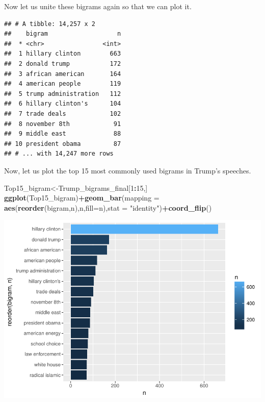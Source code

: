 \documentclass[]{article}
\newenvironment{Shaded}{\begin{snugshade}}{\end{snugshade}}
\newcommand{\KeywordTok}[1]{\textcolor[rgb]{0.13,0.29,0.53}{\textbf{#1}}}
\newcommand{\DataTypeTok}[1]{\textcolor[rgb]{0.13,0.29,0.53}{#1}}
\newcommand{\DecValTok}[1]{\textcolor[rgb]{0.00,0.00,0.81}{#1}}
\newcommand{\StringTok}[1]{\textcolor[rgb]{0.31,0.60,0.02}{#1}}
\newcommand{\OperatorTok}[1]{\textcolor[rgb]{0.81,0.36,0.00}{\textbf{#1}}}
\newcommand{\NormalTok}[1]{#1}
\begin{document}
Now let us unite these bigrams again so that we can plot it.

\begin{Shaded}
\end{Shaded}

\begin{verbatim}
## # A tibble: 14,257 x 2
##    bigram                   n
##  * <chr>                <int>
##  1 hillary clinton        663
##  2 donald trump           172
##  3 african american       164
##  4 american people        119
##  5 trump administration   112
##  6 hillary clinton's      104
##  7 trade deals            102
##  8 november 8th            91
##  9 middle east             88
## 10 president obama         87
## # ... with 14,247 more rows
\end{verbatim}

Now, let us plot the top 15 most commonly used bigrams in Trump's
speeches.

\begin{Shaded}
\begin{Highlighting}[]
\NormalTok{Top15_bigram<-Trump_bigrams_final[}\DecValTok{1}\OperatorTok{:}\DecValTok{15}\NormalTok{,]}
\KeywordTok{ggplot}\NormalTok{(Top15_bigram)}\OperatorTok{+}\KeywordTok{geom_bar}\NormalTok{(}\DataTypeTok{mapping =} \KeywordTok{aes}\NormalTok{(}\KeywordTok{reorder}\NormalTok{(bigram,n),n,}\DataTypeTok{fill=}\NormalTok{n),}\DataTypeTok{stat =} \StringTok{"identity"}\NormalTok{)}\OperatorTok{+}\KeywordTok{coord_flip}\NormalTok{()}
\end{Highlighting}
\end{Shaded}

\includegraphics{Donald_Trump_Speech_sentiment_analysis_files/figure-latex/unnamed-chunk-26-1.pdf}
\end{document}

